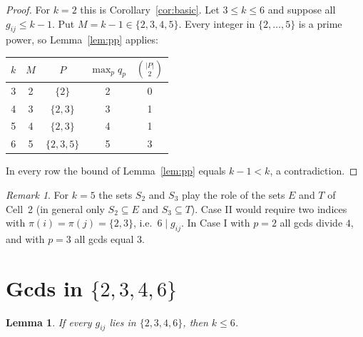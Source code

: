 \documentclass[11pt]{article}
\newtheorem{lemma}[theorem]{Lemma}
\theoremstyle{remark}
\newtheorem{remark}[theorem]{Remark}
\theoremstyle{definition}
\begin{document}
\begin{proof}
For $k=2$ this is Corollary~\ref{cor:basic}. Let $3\le k\le6$ and suppose all $g_{ij}\le k-1$. Put
$M=k-1\in\{2,3,4,5\}$. Every integer in $\{2,\dots,5\}$ is a prime power, so Lemma~\ref{lem:pp}
applies:
\begin{center}
\begin{tabular}{c|c|c|c|c}
$k$ & $M$ & $P$ & $\max_p q_p$ & $\binom{|P|}{2}$\\ \hline
3 & 2 & $\{2\}$ & 2 & 0\\
4 & 3 & $\{2,3\}$ & 3 & 1\\
5 & 4 & $\{2,3\}$ & 4 & 1\\
6 & 5 & $\{2,3,5\}$ & 5 & 3
\end{tabular}
\end{center}
In every row the bound of Lemma~\ref{lem:pp} equals $k-1<k$, a contradiction.
\end{proof}

\begin{remark}
For $k=5$ the sets $S_2$ and $S_3$ play the role of the sets $E$ and $T$ of Cell~2 (in general
only $S_2\subseteq E$ and $S_3\subseteq T$). Case II would require
two indices with $\pi(i)=\pi(j)=\{2,3\}$, i.e.\ $6\mid g_{ij}$. In Case I with $p=2$ all gcds
divide $4$, and with $p=3$ all gcds equal $3$.
\end{remark}

\section{Gcds in $\{2,3,4,6\}$}

\begin{lemma}\label{lem:W}
If every $g_{ij}$ lies in $\{2,3,4,6\}$, then $k\le6$.
\end{lemma}
\end{document}
